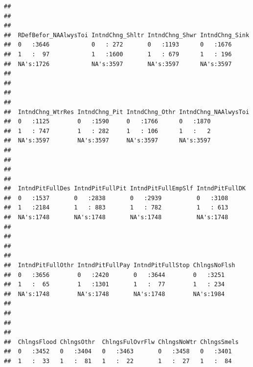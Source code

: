 \documentclass[11pt,]{article}
\begin{document}
\begin{verbatim}
##                                                                   
##                                                                   
##                                                                   
##  RDefBefor_NAAlwysToi IntndChng_Shltr IntndChng_Shwr IntndChng_Sink
##  0   :3646            0   : 272       0   :1193      0   :1676     
##  1   :  97            1   :1600       1   : 679      1   : 196     
##  NA's:1726            NA's:3597       NA's:3597      NA's:3597     
##                                                                    
##                                                                    
##                                                                    
##                                                                    
##  IntndChng_WtrRes IntndChng_Pit IntndChng_Othr IntndChng_NAAlwysToi
##  0   :1125        0   :1590     0   :1766      0   :1870           
##  1   : 747        1   : 282     1   : 106      1   :   2           
##  NA's:3597        NA's:3597     NA's:3597      NA's:3597           
##                                                                    
##                                                                    
##                                                                    
##                                                                    
##  IntndPitFullDes IntndPitFullPit IntndPitFullEmpSlf IntndPitFullDK
##  0   :1537       0   :2838       0   :2939          0   :3108     
##  1   :2184       1   : 883       1   : 782          1   : 613     
##  NA's:1748       NA's:1748       NA's:1748          NA's:1748     
##                                                                   
##                                                                   
##                                                                   
##                                                                   
##  IntndPitFullOthr IntndPitFullPay IntndPitFullStop ChlngsNoFlsh
##  0   :3656        0   :2420       0   :3644        0   :3251   
##  1   :  65        1   :1301       1   :  77        1   : 234   
##  NA's:1748        NA's:1748       NA's:1748        NA's:1984   
##                                                                
##                                                                
##                                                                
##                                                                
##  ChlngsFlood ChlngsOthr  ChlngsFulOvrFlw ChlngsNoWtr ChlngsSmels
##  0   :3452   0   :3404   0   :3463       0   :3458   0   :3401  
##  1   :  33   1   :  81   1   :  22       1   :  27   1   :  84  

\end{verbatim}
\end{document}
